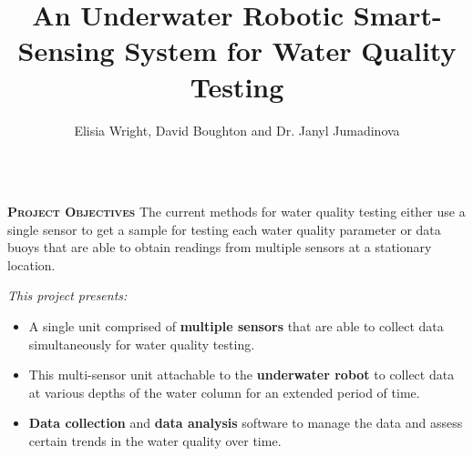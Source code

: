 \documentclass[final,t]{beamer}
\title[]{An Underwater Robotic Smart-Sensing System for Water Quality Testing }
\author[Wright]{Elisia Wright, David Boughton and Dr. Janyl Jumadinova}
\institute{Department of Computer Science, Allegheny College \\ Meadville, PA}
\begin{document}
    \begin{frame}{}
        \begin{columns}[t]
        	\begin{column}{1\linewidth}

                \begin{alertblock}{\textsc{\textbf{Project Objectives}}}
                    \vspace*{3mm}
                    The current methods for water quality testing either use a
                    single sensor to get a  sample for testing each water
                    quality parameter or data buoys that are able to
                    obtain readings from multiple sensors at a stationary location.
                    \vspace{3mm}

                    \emph{This project presents:}
                    \begin{itemize}
                        \item A single unit comprised of \textbf{multiple sensors}
                        that are able to collect data simultaneously for water
                        quality testing.
                        \item This multi-sensor unit attachable to the \textbf{underwater robot}
                        to collect data at various depths of the water column for
                        an extended period of time.
                        \item \textbf{Data collection} and \textbf{data analysis}
                        software to manage the data and assess certain trends in
                        the water quality over time.
                    \end{itemize}
                    \vspace*{6mm}
                \end{alertblock}
			\end{column}
		\end{columns}


\end{frame}
\end{document}
